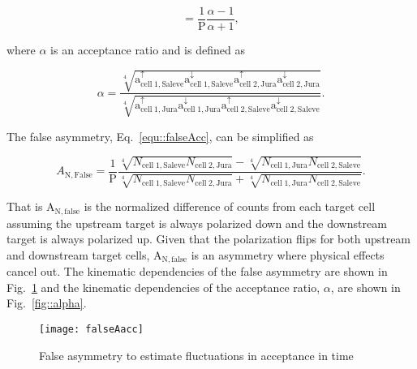 \begin{equation}
  \label{equ::alphaAsym}
 = \frac{1}{\mathrm{P}}
  \frac{
    \alpha - 1     
  }{
    \alpha + 1
  },
\end{equation}

\noindent
where $\alpha$ is an acceptance ratio and is defined as

\begin{equation} \label{equ::alphaAcc}
  \alpha = \frac{ \sqrt[4]{ \mathrm{a}^{\uparrow}_{\mathrm{cell\;1,Saleve}}
      \mathrm{a}^{\downarrow}_{\mathrm{cell\;1,Saleve}}
      \mathrm{a}^{\uparrow}_{\mathrm{cell\;2,Jura}}
      \mathrm{a}^{\downarrow}_{\mathrm{cell\;2,Jura}}} }{ \sqrt[4]{
      \mathrm{a}^{\uparrow}_{\mathrm{cell\;1,Jura}}
      \mathrm{a}^{\downarrow}_{\mathrm{cell\;1,Jura}}
      \mathrm{a}^{\uparrow}_{\mathrm{cell\;2,Saleve}}
      \mathrm{a}^{\downarrow}_{\mathrm{cell\;2,Saleve}}} }.
\end{equation}

\noindent
The false asymmetry, Eq.~\ref{equ::falseAcc}, can be simplified as

\begin{equation}
  A_{\mathrm{N,False}} = 
  \frac{1}{\mathrm{P}}
  \frac{
    \sqrt[4]{
      N_{\mathrm{cell\;1, Saleve}}
      N_{\mathrm{cell\;2, Jura}}
    } -
    \sqrt[4]{
      N_{\mathrm{cell\;1, Jura}}
      N_{\mathrm{cell\;2, Saleve}}
    }
  }{
    \sqrt[4]{
      N_{\mathrm{cell\;1, Saleve}}
      N_{\mathrm{cell\;2, Jura}}
    } +
    \sqrt[4]{
      N_{\mathrm{cell\;1, Jura}}
      N_{\mathrm{cell\;2, Saleve}}
    }
  }.
\end{equation}

\noindent
That is A$_{\mathrm{N,false}}$ is the normalized difference of counts from each
target cell assuming the upstream target is always polarized down and the
downstream target is always polarized up.  Given that the polarization flips for
both upstream and downstream target cells, A$_{\mathrm{N,false}}$ is an
asymmetry where physical effects cancel out.  The kinematic dependencies of the
false asymmetry are shown in Fig.~\ref{fig::falseAacc} and the kinematic
dependencies of the acceptance ratio, $\alpha$, are shown in
Fig.~\ref{fig::alpha}.

\begin{figure}[h!t]
  \begin{center}
    \texttt{[image: falseAacc]}
    \caption{False asymmetry to estimate fluctuations in acceptance in time}
    \label{fig::falseAacc}
  \end{center}
\end{figure}

